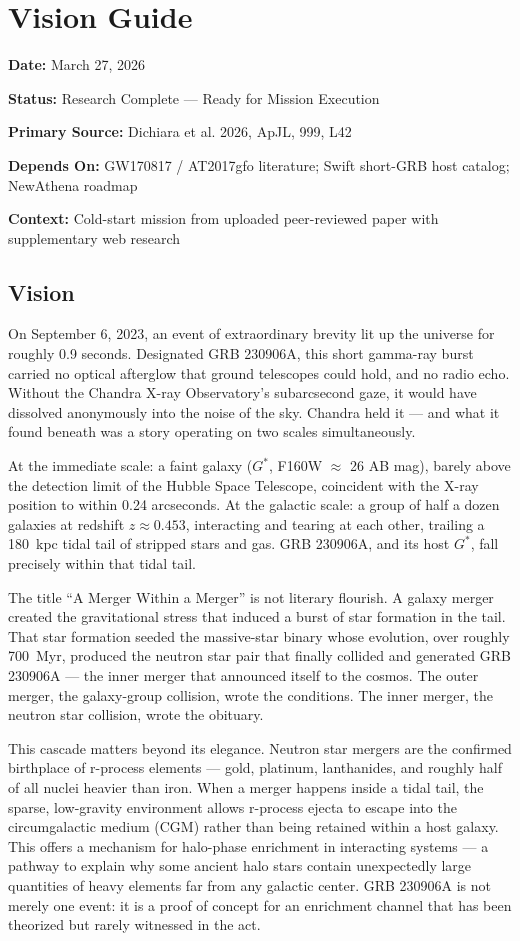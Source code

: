 \documentclass[11pt,letterpaper]{article}
\newcommand{\metafield}[2]{\textbf{\sffamily #1} #2\par}
\begin{document}
\section{Vision Guide}

\metafield{Date:}{March 27, 2026}
\metafield{Status:}{Research Complete --- Ready for Mission Execution}
\metafield{Primary Source:}{Dichiara et al. 2026, ApJL, 999, L42}
\metafield{Depends On:}{GW170817 / AT2017gfo literature; Swift short-GRB host catalog; NewAthena roadmap}
\metafield{Context:}{Cold-start mission from uploaded peer-reviewed paper with supplementary web research}

\subsection{Vision}

On September 6, 2023, an event of extraordinary brevity lit up the universe for roughly 0.9 seconds. Designated GRB 230906A, this short gamma-ray burst carried no optical afterglow that ground telescopes could hold, and no radio echo. Without the Chandra X-ray Observatory's subarcsecond gaze, it would have dissolved anonymously into the noise of the sky. Chandra held it --- and what it found beneath was a story operating on two scales simultaneously.

At the immediate scale: a faint galaxy ($G^*$, F160W $\approx$ 26 AB mag), barely above the detection limit of the Hubble Space Telescope, coincident with the X-ray position to within 0.24 arcseconds. At the galactic scale: a group of half a dozen galaxies at redshift $z \approx 0.453$, interacting and tearing at each other, trailing a 180~kpc tidal tail of stripped stars and gas. GRB 230906A, and its host $G^*$, fall precisely within that tidal tail.

The title ``A Merger Within a Merger'' is not literary flourish. A galaxy merger created the gravitational stress that induced a burst of star formation in the tail. That star formation seeded the massive-star binary whose evolution, over roughly 700~Myr, produced the neutron star pair that finally collided and generated GRB 230906A --- the inner merger that announced itself to the cosmos. The outer merger, the galaxy-group collision, wrote the conditions. The inner merger, the neutron star collision, wrote the obituary.

This cascade matters beyond its elegance. Neutron star mergers are the confirmed birthplace of r-process elements --- gold, platinum, lanthanides, and roughly half of all nuclei heavier than iron. When a merger happens inside a tidal tail, the sparse, low-gravity environment allows r-process ejecta to escape into the circumgalactic medium (CGM) rather than being retained within a host galaxy. This offers a mechanism for halo-phase enrichment in interacting systems --- a pathway to explain why some ancient halo stars contain unexpectedly large quantities of heavy elements far from any galactic center. GRB 230906A is not merely one event: it is a proof of concept for an enrichment channel that has been theorized but rarely witnessed in the act.
\end{document}
